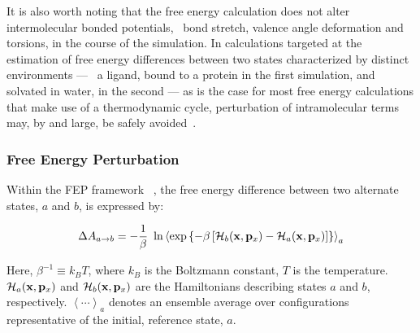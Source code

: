 It is also worth noting that the free energy calculation does not alter
intermolecular bonded potentials, \eg~bond stretch, valence angle deformation
and torsions, in the course of the simulation. In calculations targeted at the
estimation of free energy differences between two states characterized by
distinct environments --- \eg~a ligand, bound to a protein in the first
simulation, and solvated in water, in the second --- as is the case for most
free energy calculations that make use of a thermodynamic cycle, perturbation
of intramolecular terms may, by and large, be safely
avoided~\cite{Boresch1999}.



\subsubsection{Free Energy Perturbation}
\label{section:fepintro}


Within the FEP framework
~\cite{Beveridge1989,Chipot2002g,Chipot2007,Gilson1997,Kollman1993,Mark1998,Straatsma1992,VanGunsteren1989,Zwanzig1954},
the free energy difference between two
alternate states, $a$ and $b$, is expressed by:


\begin{equation}
\Delta A_{a \rightarrow b} = -\frac{1}{\beta} \ \ln
                              \left\langle \exp \left\{-\beta
                                                \left[{\cal H}_b({\bf x}, {\bf p}_x) -
                                                      {\cal H}_a({\bf x}, {\bf p}_x)
                                                \right]
                                                \right\}
                                                \right\rangle_a
\label{fep}
\end{equation}


\noindent Here, $\beta^{-1} \equiv k_B T$, where $k_B$ is the Boltzmann
constant, $T$ is the temperature. ${\cal H}_a({\bf x}, {\bf p}_x)$ and ${\cal
H}_b({\bf x}, {\bf p}_x)$ are the Hamiltonians describing states $a$ and $b$,
respectively. $\left\langle \cdots \right\rangle_a$ denotes an ensemble average
over configurations representative of the initial, reference state, $a$.


